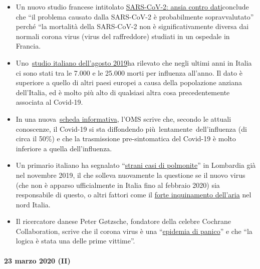 \begin{itemize}
\tightlist
\item
  Un nuovo studio francese intitolato
  \href{https://www.sciencedirect.com/science/article/abs/pii/S0924857920300972}{SARS-CoV-2:
  ansia contro dati}conclude che ``il problema causato dalla SARS-CoV-2
  è probabilmente sopravvalutato'' perché ``la mortalità della
  SARS-CoV-2 non è significativamente diversa dai normali corona virus
  (virus del raffreddore) studiati in un ospedale in Francia.
\item
  Uno~\href{https://www.ijidonline.com/article/S1201-9712(19)30328-5/fulltext}{studio
  italiano dell'agosto 2019}ha rilevato che negli ultimi anni in Italia
  ci sono stati tra le 7.000 e le 25.000 morti per influenza all'anno.
  Il dato è superiore a quello di altri paesi europei a causa della
  popolazione anziana dell'Italia, ed è molto più alto di qualsiasi
  altra cosa precedentemente associata al Covid-19.
\item
  In una
  nuova~\href{https://www.who.int/news-room/q-a-detail/q-a-similarities-and-differences-covid-19-and-influenza}{scheda
  informativa}, l'OMS scrive che, secondo le attuali conoscenze, il
  Covid-19 si sta diffondendo più~lentamente~dell'influenza (di circa il
  50\%) e che la trasmissione pre-sintomatica del Covid-19 è molto
  inferiore a quella dell'influenza.
\item
  Un primario italiano ha segnalato
  ``\href{https://www.scmp.com/news/china/society/article/3076334/coronavirus-strange-pneumonia-seen-lombardy-november-leading}{strani
  casi di polmonite}'' in Lombardia già nel novembre 2019, il che
  solleva nuovamente la questione se il nuovo virus (che non è apparso
  ufficialmente in Italia fino al febbraio 2020) sia responsabile di
  questo, o altri fattori come il
  \href{https://www.thelocal.it/20170131/our-lungs-are-breaking-smog-levels-way-above-safe-limits-in-northern-italy}{forte
  inquinamento dell'aria} nel nord Italia.
\item
  Il ricercatore danese Peter Gøtzsche, fondatore della celebre Cochrane
  Collaboration, scrive che il corona virus è una
  ``\href{https://www.deadlymedicines.dk/corona-an-epidemic-of-mass-panic/}{epidemia
  di panico}'' e che ``la logica è stata una delle prime vittime''.
\end{itemize}

\hypertarget{23-marzo-2020-ii}{%
\paragraph{23 marzo 2020 (II)}\label{23-marzo-2020-ii}}

